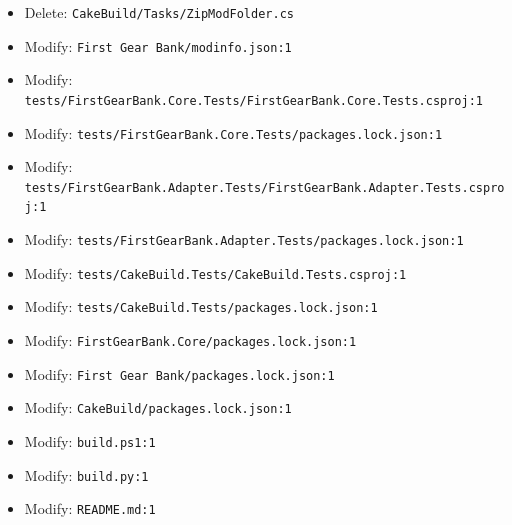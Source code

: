 \documentclass[
  10pt,
  letterpaper,
]{article}
\newcommand{\passthrough}[1]{#1}
\begin{document}
\begin{itemize}
  Delete:
  \texttt{CakeBuild/}\allowbreak{}\texttt{Tasks/}\allowbreak{}\texttt{PackageModTask.}\allowbreak{}\texttt{cs}
\item
  Delete:
  \texttt{CakeBuild/}\allowbreak{}\texttt{Tasks/}\allowbreak{}\texttt{ZipModFolder.}\allowbreak{}\texttt{cs}
\item
  Modify:
  \texttt{First\ }\allowbreak{}\texttt{Gear\ }\allowbreak{}\texttt{Bank/}\allowbreak{}\texttt{modinfo.}\allowbreak{}\texttt{json:}\allowbreak{}\texttt{1}
\item
  Modify:
  \texttt{tests/}\allowbreak{}\texttt{FirstGearBank.}\allowbreak{}\texttt{Core.}\allowbreak{}\texttt{Tests/}\allowbreak{}\texttt{FirstGearBank.}\allowbreak{}\texttt{Core.}\allowbreak{}\texttt{Tests.}\allowbreak{}\texttt{csproj:}\allowbreak{}\texttt{1}
\item
  Modify:
  \texttt{tests/}\allowbreak{}\texttt{FirstGearBank.}\allowbreak{}\texttt{Core.}\allowbreak{}\texttt{Tests/}\allowbreak{}\texttt{packages.}\allowbreak{}\texttt{lock.}\allowbreak{}\texttt{json:}\allowbreak{}\texttt{1}
\item
  Modify:
  \texttt{tests/}\allowbreak{}\texttt{FirstGearBank.}\allowbreak{}\texttt{Adapter.}\allowbreak{}\texttt{Tests/}\allowbreak{}\texttt{FirstGearBank.}\allowbreak{}\texttt{Adapter.}\allowbreak{}\texttt{Tests.}\allowbreak{}\texttt{csproj:}\allowbreak{}\texttt{1}
\item
  Modify:
  \texttt{tests/}\allowbreak{}\texttt{FirstGearBank.}\allowbreak{}\texttt{Adapter.}\allowbreak{}\texttt{Tests/}\allowbreak{}\texttt{packages.}\allowbreak{}\texttt{lock.}\allowbreak{}\texttt{json:}\allowbreak{}\texttt{1}
\item
  Modify:
  \texttt{tests/}\allowbreak{}\texttt{CakeBuild.}\allowbreak{}\texttt{Tests/}\allowbreak{}\texttt{CakeBuild.}\allowbreak{}\texttt{Tests.}\allowbreak{}\texttt{csproj:}\allowbreak{}\texttt{1}
\item
  Modify:
  \texttt{tests/}\allowbreak{}\texttt{CakeBuild.}\allowbreak{}\texttt{Tests/}\allowbreak{}\texttt{packages.}\allowbreak{}\texttt{lock.}\allowbreak{}\texttt{json:}\allowbreak{}\texttt{1}
\item
  Modify:
  \texttt{FirstGearBank.}\allowbreak{}\texttt{Core/}\allowbreak{}\texttt{packages.}\allowbreak{}\texttt{lock.}\allowbreak{}\texttt{json:}\allowbreak{}\texttt{1}
\item
  Modify:
  \texttt{First\ }\allowbreak{}\texttt{Gear\ }\allowbreak{}\texttt{Bank/}\allowbreak{}\texttt{packages.}\allowbreak{}\texttt{lock.}\allowbreak{}\texttt{json:}\allowbreak{}\texttt{1}
\item
  Modify:
  \texttt{CakeBuild/}\allowbreak{}\texttt{packages.}\allowbreak{}\texttt{lock.}\allowbreak{}\texttt{json:}\allowbreak{}\texttt{1}
\item
  Modify: \passthrough{\lstinline!build.ps1:1!}
\item
  Modify: \passthrough{\lstinline!build.py:1!}
\item
  Modify: \passthrough{\lstinline!README.md:1!}
\end{itemize}
\end{document}

